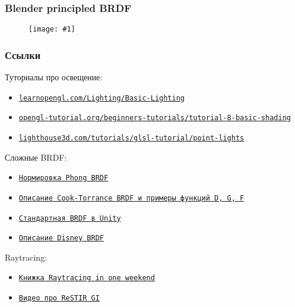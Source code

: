 \documentclass[10pt]{beamer}
\newcommand{\slideimage}[1]{
  \begin{figure}
    \begin{adjustbox}{width=\textwidth, totalheight=\textheight-2\baselineskip-2\baselineskip,keepaspectratio}
      \texttt{[image: \#1]}
    \end{adjustbox}
  \end{figure}
}
\begin{document}
\begin{frame}[fragile]
\frametitle{Blender principled BRDF}
\slideimage{principled.png}
\end{frame}

\begin{frame}[fragile]
\frametitle{Ссылки}
\fontsize{8pt}{8pt}
Туториалы про освещение:
\begin{itemize}
\item \href{https://learnopengl.com/Lighting/Basic-Lighting}{\texttt{learnopengl.com/Lighting/Basic-Lighting}}
\item \href{http://www.opengl-tutorial.org/beginners-tutorials/tutorial-8-basic-shading}{\texttt{opengl-tutorial.org/beginners-tutorials/tutorial-8-basic-shading}}
\item \href{https://www.lighthouse3d.com/tutorials/glsl-tutorial/point-lights}{\texttt{lighthouse3d.com/tutorials/glsl-tutorial/point-lights}}
\end{itemize}
Сложные BRDF:
\begin{itemize}
\item \href{http://www.cemyuksel.com/research/papers/CGI2020_ConstantTimeEnergyNormalizationForThePhongSpecularBRDFs.pdf}{\texttt{Нормировка Phong BRDF}}
\item \href{https://graphicscompendium.com/references/cook-torrance}{\texttt{Описание Cook-Torrance BRDF и примеры функций D, G, F}}
\item \href{https://github.com/TwoTailsGames/Unity-Built-in-Shaders/blob/master/CGIncludes/UnityStandardBRDF.cginc}{\texttt{Стандартная BRDF в Unity}}
\item \href{https://blog.selfshadow.com/publications/s2012-shading-course/burley/s2012_pbs_disney_brdf_notes_v3.pdf}{\texttt{Описание Disney BRDF}}
\end{itemize}
Raytracing:
\begin{itemize}
\item \href{https://raytracing.github.io/books/RayTracingInOneWeekend.html}{\texttt{Книжка Raytracing in one weekend}}
\item \href{https://www.youtube.com/watch?v=gsZiJeaMO48}{\texttt{Видео про ReSTIR GI}}
\end{itemize}
\end{frame}
\end{document}
